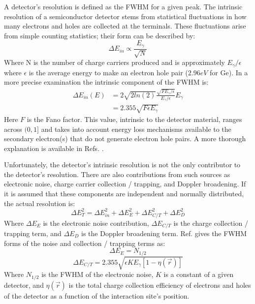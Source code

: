 A detector's resolution is defined as the FWHM for a given peak. The intrinsic resolution of a semiconductor detector stems from statistical fluctuations in how many electrons and holes are collected at the terminals. These fluctuations arise from simple counting statistics; their form can be described by:
\begin{equation}
\label{eqn:chp3-hpge-res-est} 
\Delta{}E_{in} \propto \frac{E_{\gamma}}{\sqrt{N}}
\end{equation}
Where N is the number of charge carriers produced and is approximately $E_{\gamma}/\epsilon$ where $\epsilon$ is the average energy to make an electron hole pair ($2.96eV$ for Ge). In a more precise examination the intrinsic component of the FWHM is:
\begin{equation}
\label{eqn:chp3-hpge-in-res} 
\begin{split}
\Delta{}E_{in}(E) & = 2\sqrt{2 ln(2)}\frac{\sqrt{F E_{\gamma{}}/\epsilon{}}}{E_{\gamma{}}/\epsilon{}}E_{\gamma{}}\\
       & = 2.355\sqrt{F\epsilon{}E_{\gamma{}}}
\end{split}
\end{equation}
Here $F$ is the Fano factor. This value, intrinsic to the detector material, ranges across $(0,1]$ and takes into account energy loss mechanisms available to the secondary electron(s) that do not generate electron hole pairs. A more thorough explanation is available in Refs. \cite{knollBook,fano_factor1}.

Unfortunately, the detector's intrinsic resolution is not the only contributor to the detector's resolution. There are also contributions from such sources as electronic noise, charge carrier collection / trapping, and Doppler broadening. If it is assumed that these components are independent and normally distributed, the actual resolution is:
\begin{equation}
\label{eqn:chp3-hpge-res} 
\Delta{}E_{T}^2 = \Delta{}E_{in}^2 + \Delta{}E_{E}^2 + \Delta{}E_{C/T}^2 + \Delta{}E_{D}^2
\end{equation}
Where $\Delta{}E_{E}$ is the electronic noise contribution, $\Delta{}E_{C/T}$ is the charge collection / trapping term, and $\Delta{}E_{D}$ is the Doppler broadening term. Ref. \cite{trappingResolution} gives the FWHM forms of the noise and collection / trapping terms as:
\begin{equation}
\label{eqn:chp3-hpge-res-noise} 
\Delta{}E_{E} = N_{1/2}
\end{equation}
\begin{equation}
\label{eqn:chp3-hpge-res-ct} 
\Delta{}E_{C/T} = 2.355\sqrt{\epsilon{} K E_{\gamma{}} [1-\eta{}(\vec{r})]}
\end{equation}
Where $N_{1/2}$ is the FWHM of the electronic noise, $K$ is a constant of a given detector, and $\eta{}(\vec{r})$ is the total charge collection efficiency of electrons and holes of the detector as a function of the interaction site's position.

